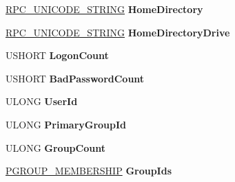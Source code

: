 \begin{DoxyCompactItemize}
\hyperlink{struct___r_p_c___u_n_i_c_o_d_e___s_t_r_i_n_g}{R\+P\+C\+\_\+\+U\+N\+I\+C\+O\+D\+E\+\_\+\+S\+T\+R\+I\+NG} {\bfseries Home\+Directory}
\item 
\mbox{\label{struct___n_e_t_l_o_g_o_n___v_a_l_i_d_a_t_i_o_n___s_a_m___i_n_f_o2_ac50be242deb2159c7a902e9bba550bef}} 
\hyperlink{struct___r_p_c___u_n_i_c_o_d_e___s_t_r_i_n_g}{R\+P\+C\+\_\+\+U\+N\+I\+C\+O\+D\+E\+\_\+\+S\+T\+R\+I\+NG} {\bfseries Home\+Directory\+Drive}
\item 
\mbox{\label{struct___n_e_t_l_o_g_o_n___v_a_l_i_d_a_t_i_o_n___s_a_m___i_n_f_o2_a282c72ed06bf6a803ae0acdb1d096e6c}} 
U\+S\+H\+O\+RT {\bfseries Logon\+Count}
\item 
\mbox{\label{struct___n_e_t_l_o_g_o_n___v_a_l_i_d_a_t_i_o_n___s_a_m___i_n_f_o2_aed4664d3eb1469a3fc70c6ea6b98597d}} 
U\+S\+H\+O\+RT {\bfseries Bad\+Password\+Count}
\item 
\mbox{\label{struct___n_e_t_l_o_g_o_n___v_a_l_i_d_a_t_i_o_n___s_a_m___i_n_f_o2_ab660e2f56bb95262ddb1a2818df94e14}} 
U\+L\+O\+NG {\bfseries User\+Id}
\item 
\mbox{\label{struct___n_e_t_l_o_g_o_n___v_a_l_i_d_a_t_i_o_n___s_a_m___i_n_f_o2_a5a80578516f78e4f269e4fe1cc2748fb}} 
U\+L\+O\+NG {\bfseries Primary\+Group\+Id}
\item 
\mbox{\label{struct___n_e_t_l_o_g_o_n___v_a_l_i_d_a_t_i_o_n___s_a_m___i_n_f_o2_ac2bfbd3bc8a7043c2bf6e74c8dc46200}} 
U\+L\+O\+NG {\bfseries Group\+Count}
\item 
\mbox{\label{struct___n_e_t_l_o_g_o_n___v_a_l_i_d_a_t_i_o_n___s_a_m___i_n_f_o2_a286075341616e4b53b108b94c3ca1a7e}} 
\hyperlink{struct___g_r_o_u_p___m_e_m_b_e_r_s_h_i_p}{P\+G\+R\+O\+U\+P\+\_\+\+M\+E\+M\+B\+E\+R\+S\+H\+IP} {\bfseries Group\+Ids}
\item 

\end{DoxyCompactItemize}
